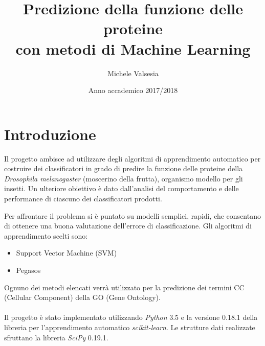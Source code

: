 

\usepackage{afterpage}

\graphicspath{{../img/}}





\title{%
        Predizione della funzione delle proteine \\
        con metodi di Machine Learning}
  
\author{Michele Valsesia}

\date{Anno accademico 2017/2018} 

\maketitle

\tableofcontents


\newpage

\section*{Introduzione}
Il progetto ambisce ad utilizzare degli algoritmi di apprendimento automatico per costruire dei classificatori in grado di predire la funzione delle proteine della \textit{Drosophila melanogaster} (moscerino della frutta), organismo modello per gli insetti. Un ulteriore obiettivo è dato dall'analisi del comportamento e delle performance di ciascuno dei classificatori prodotti.

Per affrontare il problema si è puntato su modelli semplici, rapidi, che consentano di ottenere una buona valutazione dell'errore di classificazione. Gli algoritmi di apprendimento scelti sono: 

\begin{itemize}
    \item Support Vector Machine (SVM)    
    \item Pegasos
\end{itemize}

Ognuno dei metodi elencati verrà utilizzato per la predizione dei termini CC (Cellular Component) della GO (Gene Ontology).

\paragraph*{}
Il progetto è stato implementato utilizzando \textit{Python} 3.5 e la versione 0.18.1 della libreria per l'apprendimento automatico \textit{scikit-learn}. Le strutture dati realizzate sfruttano la libreria \textit{SciPy} 0.19.1.

